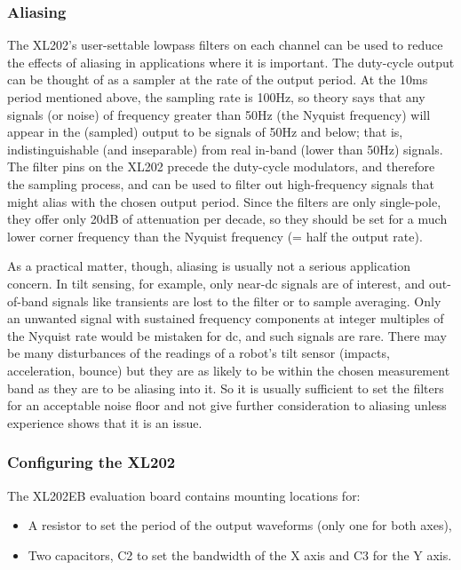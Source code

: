 \documentclass{article}
\begin{document}
\subsubsection{Aliasing}

The XL202's user-settable lowpass filters on each channel can be used
to reduce the effects of aliasing in applications where it is
important.  The duty-cycle output can be thought of as a sampler at
the rate of the output period.  At the 10ms period mentioned above,
the sampling rate is 100Hz, so theory says that any signals (or noise)
of frequency greater than 50Hz (the Nyquist frequency) will appear in
the (sampled) output to be signals of 50Hz and below; that is,
indistinguishable (and inseparable) from real in-band (lower than 50Hz) signals.
The filter pins on the XL202 precede the duty-cycle modulators, and
therefore the sampling process, and can be used to filter out
high-frequency signals that might alias with the chosen output period.
Since the filters are only single-pole, they offer only 20dB of
attenuation per decade, so they should be set for a much lower corner
frequency than the Nyquist frequency (= half the output rate).

As a practical matter, though, aliasing is usually not a serious
application concern.   In tilt sensing, for example, only near-dc
signals are of interest, and out-of-band signals like transients are
lost to the filter or to sample averaging.  Only an unwanted signal
with sustained frequency components at integer multiples of the
Nyquist rate would be mistaken for dc, and such signals are rare.
There may be many disturbances of the readings of a robot's tilt
sensor (impacts, acceleration, bounce) but they are as likely to be
within the chosen measurement band as they are to be aliasing into it.
So it is usually sufficient to set the filters for an acceptable noise
floor and not give further consideration to aliasing unless experience
shows that it is an issue.

\subsubsection{Configuring the XL202}

The XL202EB evaluation board contains mounting locations for:
\begin{itemize}
\item
 A resistor to set the period of the output waveforms (only one
   for both axes),
\item
 Two capacitors, C2 to set the bandwidth of the X axis and C3 for
   the Y axis.
\end{itemize}
\end{document}
